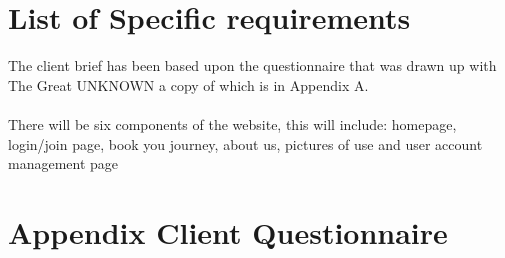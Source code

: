 \documentclass{article}
\begin{document}
\section{List of Specific requirements}
The client brief has been based upon the questionnaire that was drawn up with The Great UNKNOWN a copy of which is in Appendix A.
\\
\\
There will be six components of the website, this will include:  homepage, login/join page, book you journey, about us, pictures of use and user account management page
\appendix

\section{Appendix Client Questionnaire}
\end{document}

